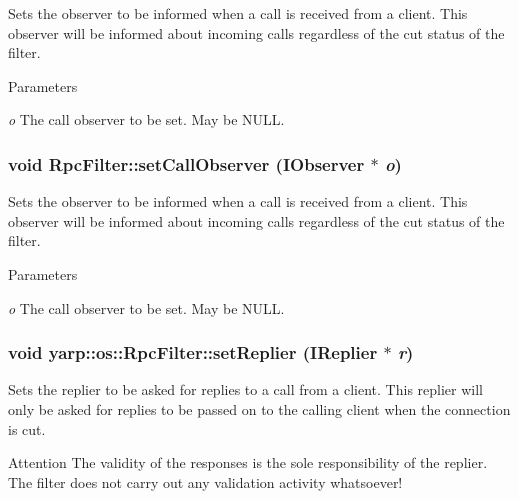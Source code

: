 Sets the observer to be informed when a call is received from a client. This observer will be informed about incoming calls regardless of the cut status of the filter. 
\begin{DoxyParams}{Parameters}
\item[{\em o}]The call observer to be set. May be {\ttfamily NULL}. \end{DoxyParams}
\hypertarget{classyarp_1_1os_1_1_rpc_filter_a36f86ee737cfff2cb29b8b0187bffe84}{
\subsubsection[{setCallObserver}]{\setlength{\rightskip}{0pt plus 5cm}void RpcFilter::setCallObserver ({\bf IObserver} $\ast$ {\em o})}}
\label{classyarp_1_1os_1_1_rpc_filter_a36f86ee737cfff2cb29b8b0187bffe84}
Sets the observer to be informed when a call is received from a client. This observer will be informed about incoming calls regardless of the cut status of the filter. 
\begin{DoxyParams}{Parameters}
\item[{\em o}]The call observer to be set. May be {\ttfamily NULL}. \end{DoxyParams}
\hypertarget{classyarp_1_1os_1_1_rpc_filter_ad4f258b19fad32ab782e4eb608dd6c32}{
\subsubsection[{setReplier}]{\setlength{\rightskip}{0pt plus 5cm}void yarp::os::RpcFilter::setReplier ({\bf IReplier} $\ast$ {\em r})}}
\label{classyarp_1_1os_1_1_rpc_filter_ad4f258b19fad32ab782e4eb608dd6c32}
Sets the replier to be asked for replies to a call from a client. This replier will only be asked for replies to be passed on to the calling client when the connection is cut.

\begin{DoxyAttention}{Attention}
The validity of the responses is the sole responsibility of the replier. The filter does not carry out any validation activity whatsoever! 
\end{DoxyAttention}

